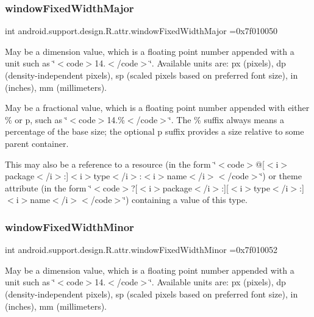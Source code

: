 \subsubsection{\texorpdfstring{window\+Fixed\+Width\+Major}{windowFixedWidthMajor}}
{\footnotesize\ttfamily int android.\+support.\+design.\+R.\+attr.\+window\+Fixed\+Width\+Major =0x7f010050\hspace{0.3cm}{\ttfamily [static]}}

May be a dimension value, which is a floating point number appended with a unit such as \char`\"{}$<$code$>$14.\+5sp$<$/code$>$\char`\"{}. Available units are\+: px (pixels), dp (density-\/independent pixels), sp (scaled pixels based on preferred font size), in (inches), mm (millimeters). 

May be a fractional value, which is a floating point number appended with either \% or p, such as \char`\"{}$<$code$>$14.\%$<$/code$>$\char`\"{}. The \% suffix always means a percentage of the base size; the optional p suffix provides a size relative to some parent container. 

This may also be a reference to a resource (in the form \char`\"{}$<$code$>$@\mbox{[}$<$i$>$package$<$/i$>$\+:\mbox{]}$<$i$>$type$<$/i$>$\+:$<$i$>$name$<$/i$>$$<$/code$>$\char`\"{}) or theme attribute (in the form \char`\"{}$<$code$>$?\mbox{[}$<$i$>$package$<$/i$>$\+:\mbox{]}\mbox{[}$<$i$>$type$<$/i$>$\+:\mbox{]}$<$i$>$name$<$/i$>$$<$/code$>$\char`\"{}) containing a value of this type. \mbox{\label{classandroid_1_1support_1_1design_1_1R_1_1attr_ad4eb274132a1e6ce7842da04eb6f1285}} 
\subsubsection{\texorpdfstring{window\+Fixed\+Width\+Minor}{windowFixedWidthMinor}}
{\footnotesize\ttfamily int android.\+support.\+design.\+R.\+attr.\+window\+Fixed\+Width\+Minor =0x7f010052\hspace{0.3cm}{\ttfamily [static]}}

May be a dimension value, which is a floating point number appended with a unit such as \char`\"{}$<$code$>$14.\+5sp$<$/code$>$\char`\"{}. Available units are\+: px (pixels), dp (density-\/independent pixels), sp (scaled pixels based on preferred font size), in (inches), mm (millimeters). 

